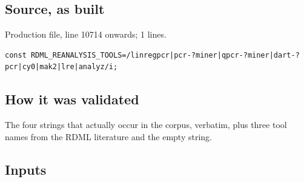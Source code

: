 \subsection*{Source, as built}
Production file, line 10714 onwards; 1 lines.
\begin{lstlisting}[style=js]
const RDML_REANALYSIS_TOOLS=/linregpcr|pcr-?miner|qpcr-?miner|dart-?pcr|cy0|mak2|lre|analyz/i;
\end{lstlisting}

\subsection*{How it was validated}
The four strings that actually occur in the corpus, verbatim, plus three tool names from
the RDML literature and the empty string.
\subsection*{Inputs}
